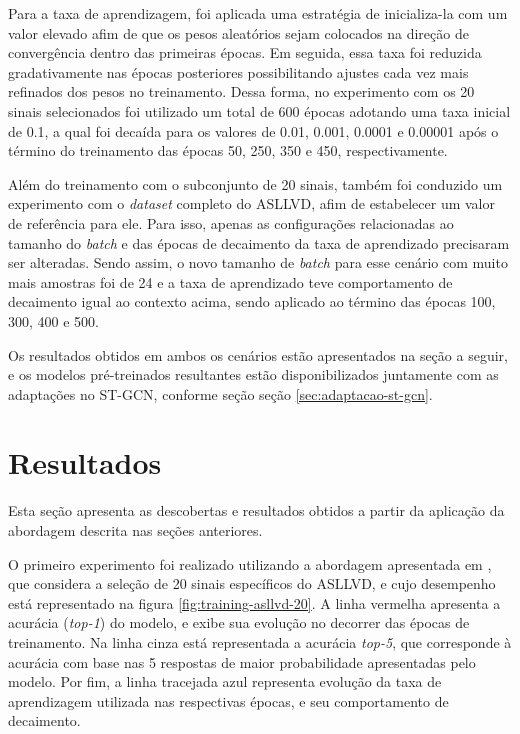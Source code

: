 Para a taxa de aprendizagem, foi aplicada uma estratégia de inicializa-la com um valor elevado afim de que os pesos aleatórios sejam colocados na direção de convergência dentro das primeiras épocas. Em seguida, essa taxa foi reduzida gradativamente nas épocas posteriores possibilitando ajustes cada vez mais refinados dos pesos no treinamento. Dessa forma, no experimento com os 20 sinais selecionados foi utilizado um total de 600 épocas adotando uma taxa inicial de 0.1, a qual foi decaída para os valores de 0.01, 0.001, 0.0001 e 0.00001 após o término do treinamento das épocas 50, 250, 350 e 450, respectivamente.


Além do treinamento com o subconjunto de 20 sinais, também foi conduzido um experimento com o \textit{dataset} completo do ASLLVD, afim de estabelecer um valor de referência para ele. Para isso, apenas as configurações relacionadas ao tamanho do \textit{batch} e das épocas de decaimento da taxa de aprendizado precisaram ser alteradas. Sendo assim, o novo tamanho de \textit{batch} para esse cenário com muito mais amostras foi de 24 e a taxa de aprendizado teve comportamento de decaimento igual ao contexto acima, sendo aplicado ao término das épocas 100, 300, 400 e 500.

Os resultados obtidos em ambos os cenários estão apresentados na seção a seguir, e os modelos pré-treinados resultantes estão disponibilizados juntamente com as adaptações no ST-GCN, conforme seção seção \ref{sec:adaptacao-st-gcn}.


\section{Resultados} %
\label{sec:resultados}

Esta seção apresenta as descobertas e resultados obtidos a partir da aplicação da abordagem descrita nas seções anteriores. 

O primeiro experimento foi realizado utilizando a abordagem apresentada em \cite{lim-2016}, que considera a seleção de 20 sinais específicos do ASLLVD, e cujo desempenho está representado na figura \ref{fig:training-asllvd-20}. A linha vermelha apresenta a acurácia (\textit{top-1}) do modelo, e exibe sua evolução no decorrer das épocas de treinamento. Na linha cinza está representada a acurácia \textit{top-5}, que corresponde à acurácia com base nas 5 respostas de maior probabilidade apresentadas pelo modelo. Por fim, a linha tracejada azul representa evolução da taxa de aprendizagem utilizada nas respectivas épocas, e seu comportamento de decaimento.

